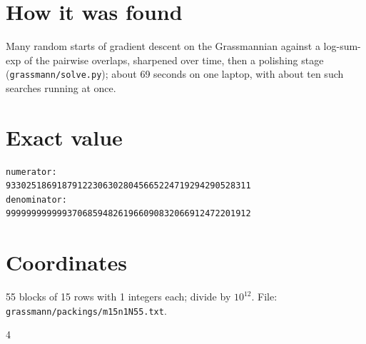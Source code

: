 \documentclass[11pt,a4paper]{article}
\begin{document}
\section{How it was found}
Many random starts of gradient descent on the Grassmannian against a log-sum-exp of the pairwise overlaps, sharpened over time, then a polishing stage (\texttt{grassmann/solve.py}); about 69 seconds on one laptop, with about ten such searches running at once.


\appendix
\section{Exact value}
{\small
\begin{verbatim}
numerator:
933025186918791223063028045665224719294290528311
denominator:
999999999999370685948261966090832066912472201912
\end{verbatim}}

\section{Coordinates}
55 blocks of 15 rows with 1 integers each; divide by $10^{12}$. File: \texttt{grassmann/packings/m15n1N55.txt}.
{\tiny
\begin{multicols}{4}
\end{multicols}}
\end{document}
